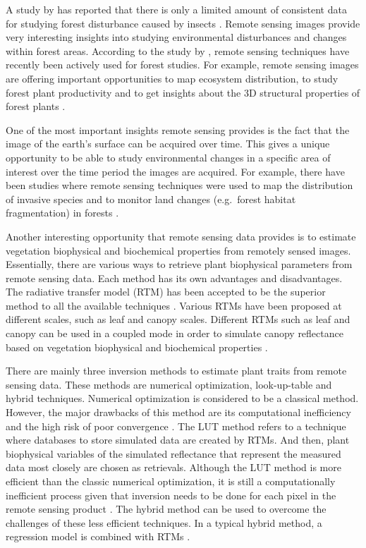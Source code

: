 \documentclass[a4paper, twoside]{templates/ociamthesis}
\begin{document}
A study by \citet{kautz2017biotic} has reported that there is only a limited amount of consistent data for studying forest disturbance caused by insects \citep{senf2017remote}. Remote sensing images provide very interesting insights into studying environmental disturbances and changes within forest areas. According to the study by \citet{lechner2020applications}, remote sensing techniques have recently been actively used for forest studies. For example, remote sensing images are offering important opportunities to map ecosystem distribution, to study forest plant productivity and to get insights about the 3D structural properties of forest plants \citep{lechner2020applications}.

One of the most important insights remote sensing provides is the fact that the image of the earth's surface can be acquired over time. This gives a unique opportunity to be able to study environmental changes in a specific area of interest over the time period the images are acquired. For example, there have been studies where remote sensing techniques were used to map the distribution of invasive species and to monitor land changes (e.g.~forest habitat fragmentation) in forests \citep{lechner2020applications}.

Another interesting opportunity that remote sensing data provides is to estimate vegetation biophysical and biochemical properties from remotely sensed images. Essentially, there are various ways to retrieve plant biophysical parameters from remote sensing data. Each method has its own advantages and disadvantages. The radiative transfer model (RTM) has been accepted to be the superior method to all the available techniques \citep{darvishzadeh2019analysis, wang2018mapping}. Various RTMs have been proposed at different scales, such as leaf and canopy scales. Different RTMs such as leaf and canopy can be used in a coupled mode in order to simulate canopy reflectance based on vegetation biophysical and biochemical properties \citep{morcillo2019quantifying}.

There are mainly three inversion methods to estimate plant traits from remote sensing data. These methods are numerical optimization, look-up-table and hybrid techniques. Numerical optimization is considered to be a classical method. However, the major drawbacks of this method are its computational inefficiency and the high risk of poor convergence \citep{zhang2021analyzing}. The LUT method refers to a technique where databases to store simulated data are created by RTMs. And then, plant biophysical variables of the simulated reflectance that represent the measured data most closely are chosen as retrievals. Although the LUT method is more efficient than the classic numerical optimization, it is still a computationally inefficient process given that inversion needs to be done for each pixel in the remote sensing product \citep{danner2021efficient}. The hybrid method can be used to overcome the challenges of these less efficient techniques. In a typical hybrid method, a regression model is combined with RTMs \citep{zhang2021analyzing}.
\end{document}
